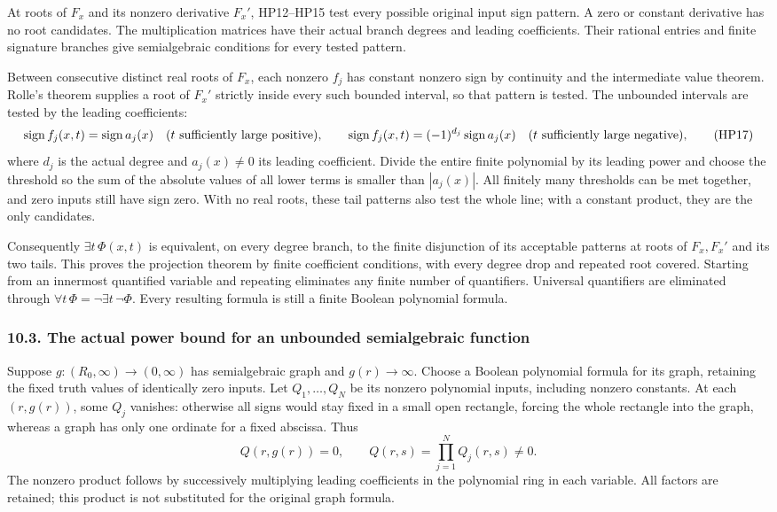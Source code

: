 \documentclass[
  11pt,
]{article}
\begin{document}
At roots of \(F_x\) and its nonzero derivative \(F_x'\), HP12--HP15 test
every possible original input sign pattern. A zero or constant
derivative has no root candidates. The multiplication matrices have
their actual branch degrees and leading coefficients. Their rational
entries and finite signature branches give semialgebraic conditions for
every tested pattern.

Between consecutive distinct real roots of \(F_x\), each nonzero \(f_j\)
has constant nonzero sign by continuity and the intermediate value
theorem. Rolle's theorem supplies a root of \(F_x'\) strictly inside
every such bounded interval, so that pattern is tested. The unbounded
intervals are tested by the leading coefficients: {\fontsize{7.5}{9}\selectfont
\[
\operatorname{sign}f_j(x,t)=\operatorname{sign}a_j(x)
\quad(t\hbox{ sufficiently large positive}),\qquad
\operatorname{sign}f_j(x,t)=(-1)^{d_j}\operatorname{sign}a_j(x)
\quad(t\hbox{ sufficiently large negative}),
\tag{HP17}
\]
} where \(d_j\) is the actual degree and \(a_j(x)\ne0\) its leading
coefficient. Divide the entire finite polynomial by its leading power
and choose the threshold so the sum of the absolute values of all lower
terms is smaller than \(|a_j(x)|\). All finitely many thresholds can be
met together, and zero inputs still have sign zero. With no real roots,
these tail patterns also test the whole line; with a constant product,
they are the only candidates.

Consequently \(\exists t\,\Phi(x,t)\) is equivalent, on every degree
branch, to the finite disjunction of its acceptable patterns at roots of
\(F_x,F_x'\) and its two tails. This proves the projection theorem by
finite coefficient conditions, with every degree drop and repeated root
covered. Starting from an innermost quantified variable and repeating
eliminates any finite number of quantifiers. Universal quantifiers are
eliminated through \(\forall t\,\Phi=\neg\exists t\,\neg\Phi\). Every
resulting formula is still a finite Boolean polynomial formula.

\subsubsection{10.3. The actual power bound for an unbounded
semialgebraic
function}\label{the-actual-power-bound-for-an-unbounded-semialgebraic-function}

Suppose \(g:(R_0,\infty)\to(0,\infty)\) has semialgebraic graph and
\(g(r)\to\infty\). Choose a Boolean polynomial formula for its graph,
retaining the fixed truth values of identically zero inputs. Let
\(Q_1,\ldots,Q_N\) be its nonzero polynomial inputs, including nonzero
constants. At each \((r,g(r))\), some \(Q_j\) vanishes: otherwise all
signs would stay fixed in a small open rectangle, forcing the whole
rectangle into the graph, whereas a graph has only one ordinate for a
fixed abscissa. Thus \[
Q(r,g(r))=0,\qquad Q(r,s)=\prod_{j=1}^{N}Q_j(r,s)\ne0.
\tag{HP18}
\] The nonzero product follows by successively multiplying leading
coefficients in the polynomial ring in each variable. All factors are
retained; this product is not substituted for the original graph
formula.
\end{document}
